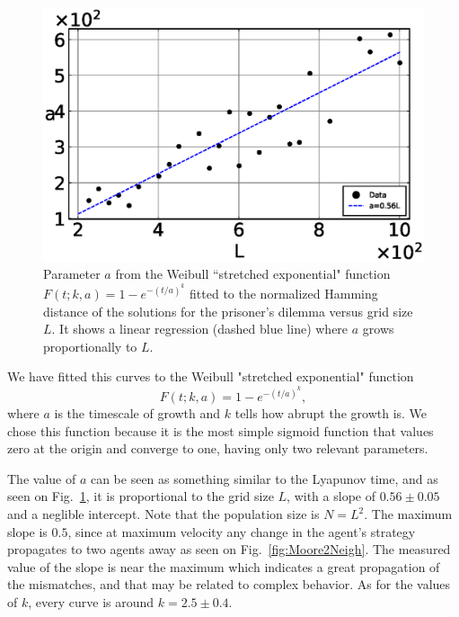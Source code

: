 \begin{figure}
	\centering
	\includegraphics[width=0.8\linewidth]{Images/P3/aVSL_PD.eps}
	\caption{Parameter $a$ from the Weibull ``stretched exponential" function $F(t;k,a)=1-e^{-(t/a)^k}$ fitted to the normalized Hamming distance of the solutions for the prisoner's dilemma versus grid size $L$. It shows a linear regression (dashed blue line) where $a$ grows proportionally to $L$.}
	\label{fig:aVSL_PD}
\end{figure}





We have fitted this curves to the Weibull "stretched exponential" function~\cite{Weibull}
\begin{equation}
    F(t;k,a)=1-e^{-(t/a)^k},
    \label{WeibullDistr}
\end{equation}
where $a$ is the timescale of growth and $k$ tells how abrupt the growth is. We chose this function because it is the most simple sigmoid function that values zero at the origin and converge to one, having only two relevant parameters.

The value of $a$ can be seen as something similar to the Lyapunov time, and as seen on Fig.~\ref{fig:aVSL_PD}, it is proportional to the grid size $L$, with a slope of $0.56 \pm 0.05$ and a neglible intercept. Note that the population size is $N = L^2$. The maximum slope is $0.5$, since at maximum velocity any change in the agent's strategy propagates to two agents away as seen on Fig.~\ref{fig:Moore2Neigh}. The measured value of the slope is near the maximum which indicates a great propagation of the mismatches, and that may be related to complex behavior. As for the values of $k$, every curve is around $k = 2.5\pm0.4$.




